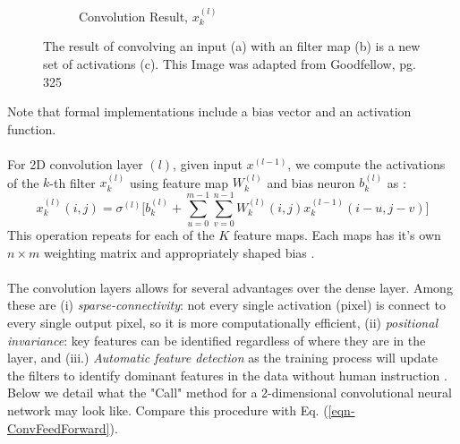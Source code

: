\documentclass[12pt,letterpaper]{article}
\begin{document}
\begin{figure}[H]
\begin{center}
\begin{subfigure}{0.9\textwidth}
	\caption{Convolution Result, $x^{(l)}_k$}
	\end{subfigure}	
\end{center}
\caption{The result of convolving an input (a) with an filter map (b) is a new set of activations (c). This Image was adapted from Goodfellow, pg. 325 \cite{Goodfellow}}
\label{fig-2DConvExample}
\end{figure}
Note that formal implementations include a bias vector and an activation function.

\paragraph*{}For 2D convolution layer $(l)$, given input $x^{(l-1)}$, we compute the activations of the $k$-th filter $x^{(l)}_{k}$ using feature map $W^{(l)}_k$ and bias neuron $b^{(l)}_k$ as \cite{Goodfellow}:
\begin{equation}
\label{eqn-ConvFeedForward}
x^{(l)}_k(i,j) = \sigma^{(l)}\bigg[ b^{(l)}_k +  \sum_{u=0}^{m-1} \sum_{v=0}^{n-1} W^{(l)}_k(i,j) x^{(l-1)}_k(i - u,j - v) \bigg]
\end{equation}
This operation repeats for each of the $K$ feature maps. Each maps has it's own $n \times m$ weighting matrix and appropriately shaped bias .

\paragraph*{}The convolution layers allows for several advantages over the dense layer. Among these are (i) \textit{sparse-connectivity}: not every single activation (pixel) is connect to every single output pixel, so it is more computationally efficient, (ii) \textit{positional invariance}: key features can be identified regardless of where they are in the layer, and (iii.) \textit{Automatic feature detection} as the training process will update the filters to identify dominant features in the data without human instruction \cite{Geron,Goodfellow,Loy}. Below we detail what the "Call" method for a 2-dimensional convolutional neural network may look like. Compare this procedure with Eq. (\ref{eqn-ConvFeedForward}).
\end{document}
